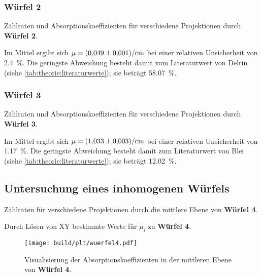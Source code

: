 \subsubsection{\textbf{Würfel 2}}
\begin{table}[H]
    \centering
    \caption{Zählraten und Absorptionskoeffizienten für verschiedene Projektionen durch \textbf{Würfel 2}.}
    \label{tab:auswertung:wuerfel2}
\end{table}
Im Mittel ergibt sich $\mu = \SI{0.049 \pm 0.001}{\per\centi\meter}$
bei einer relativen Unsicherheit von \SI{2.4}{\percent}.
Die geringste Abweichung besteht damit zum Literaturwert von Delrin (siehe \autoref{tab:theorie:literaturwerte});
sie beträgt \SI{58.07}{\percent}.


\subsubsection{\textbf{Würfel 3}}
\begin{table}[H]
    \centering
    \caption{Zählraten und Absorptionskoeffizienten für verschiedene Projektionen durch \textbf{Würfel 3}.}
    \label{tab:auswertung:wuerfel3}
\end{table}
Im Mittel ergibt sich $\mu = \SI{1.033 \pm 0.003}{\per\centi\meter}$
bei einer relativen Unsicherheit von \SI{1.17}{\percent}.
Die geringste Abweichung besteht damit zum Literaturwert von Blei (siehe \autoref{tab:theorie:literaturwerte});
sie beträgt \SI{12.02}{\percent}.


\subsection{Untersuchung eines inhomogenen Würfels}

\begin{table}[H]
    \centering
    \caption{Zählraten für verschiedene Projektionen durch die mittlere Ebene von \textbf{Würfel 4}.}
    \label{tab:auswertung:wuerfel4}
\end{table}

\begin{table}[H]
    \centering
    \caption{Durch Lösen von XY bestimmte Werte für $\mu_i$ zu \textbf{Würfel 4}.}
    \label{tab:auswertung:wuerfel4_mu}
\end{table}

\begin{figure}
    \centering
    \texttt{[image: build/plt/wuerfel4.pdf]}
    \caption{Visualisierung der Absorptionskoeffizienten in der mittleren Ebene von \textbf{Würfel 4}.}
    \label{plt:auswertung:wuerfel4}
\end{figure}
